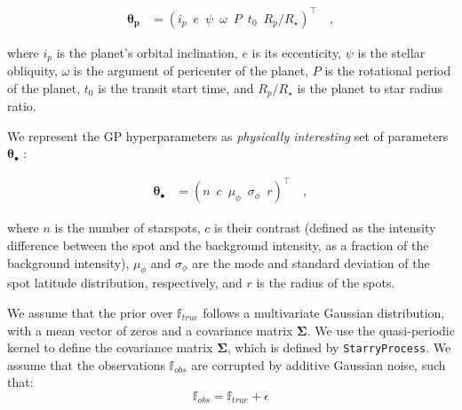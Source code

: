 \documentclass[twocolumn]{aastex631}
\begin{document}
\begin{linenomath}\begin{align}
    \label{eq:thetap}
    \pmb{\theta_p}
     & =
    \left(
    i_p
    \,\,\,
    e
    \,\,\,
    \psi
    \,\,\,
    \omega
    \,\,\,
    P
    \,\,\,
    t_0
    \,\,\,
    R_p/R_\star
    \right)^\top
    \quad,
\end{align}\end{linenomath}
where $i_p$ is the planet's orbital inclination, $e$ is its eccenticity, $\psi$ is the stellar obliquity, $\omega$ is the argument of pericenter of the planet,
$P$ is the rotational period of the planet, $t_0$ is the transit start time, and $R_p/R_\star$ is the planet to star radius ratio.

We represent the GP hyperparameters as \emph{physically interesting} set of parameters $\pmb{\theta}_\bullet$ \citep{Luger2021}:
%
\begin{linenomath}\begin{align}
        \label{eq:thetaspot}
        \pmb{\theta}_\bullet
         & =
        \left(
        n
        \,\,\,
        c
        \,\,\,
        \mu_\phi
        \,\,\,
        \sigma_\phi
        \,\,\,
        r
        \right)^\top
        \quad,
    \end{align}\end{linenomath}
%
where $n$ is the number of starspots, $c$ is their contrast (defined as the intensity difference between the spot and the 
background intensity, as a fraction of the background intensity),
$\mu_\phi$ and $\sigma_\phi$ are the mode and standard deviation
of the spot latitude distribution, respectively, and $r$ is the radius
of the spots.

We assume that the prior over $\mathbb{f}_{true}$ follows a multivariate Gaussian distribution, with a mean vector of zeros and a covariance 
matrix $\pmb{\Sigma}$. We use the quasi-periodic kernel to define the covariance matrix $\pmb{\Sigma}$, which is defined by \texttt{StarryProcess}.
We assume that the observations $\mathbb{f}_{obs}$ are corrupted by additive Gaussian noise, such that:
\begin{equation}
    \mathbb{f}_{obs} = \mathbb{f}_{true} + \epsilon
\end{equation}
\end{document}
